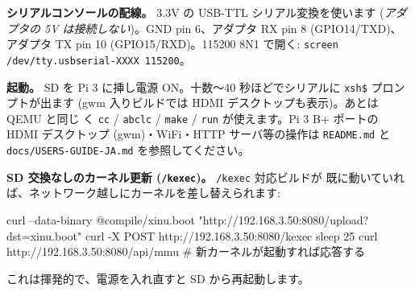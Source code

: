 \documentclass[a4paper,11pt]{ltjsarticle}
\begin{document}
\textbf{シリアルコンソールの配線。} 3.3V の USB-TTL シリアル変換を使います
(\emph{アダプタの 5V は接続しない})。GND \textrightarrow{} pin 6、アダプタ RX
\textrightarrow{} pin 8 (GPIO14/TXD)、アダプタ TX \textrightarrow{} pin 10
(GPIO15/RXD)。115200 8N1 で開く: \verb|screen /dev/tty.usbserial-XXXX 115200|。

\textbf{起動。} SD を Pi 3 に挿し電源 ON。十数〜40 秒ほどでシリアルに \verb|xsh$|
プロンプトが出ます (gwm 入りビルドでは HDMI デスクトップも表示)。あとは QEMU と同じ
く \verb|cc| / \verb|abclc| / \verb|make| / \verb|run| が使えます。Pi 3 B+ ポートの
HDMI デスクトップ (gwm)・WiFi・HTTP サーバ等の操作は \verb|README.md| と
\verb|docs/USERS-GUIDE-JA.md| を参照してください。

\textbf{SD 交換なしのカーネル更新 (\texttt{/kexec})。} \verb|/kexec| 対応ビルドが
既に動いていれば、ネットワーク越しにカーネルを差し替えられます:
\begin{code}
curl --data-binary @compile/xinu.boot "http://192.168.3.50:8080/upload?dst=xinu.boot"
curl -X POST http://192.168.3.50:8080/kexec
sleep 25
curl http://192.168.3.50:8080/api/mmu     # 新カーネルが起動すれば応答する
\end{code}
これは揮発的で、電源を入れ直すと SD から再起動します。
\end{document}
